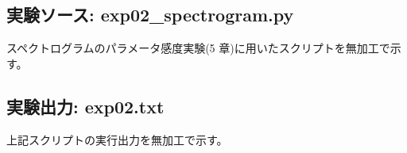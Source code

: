 \subsection{実験ソース: exp02\_spectrogram.py}

スペクトログラムのパラメータ感度実験(5 章)に用いたスクリプトを無加工で示す。

{\small

}

\subsection{実験出力: exp02.txt}

上記スクリプトの実行出力を無加工で示す。

{\small

}
